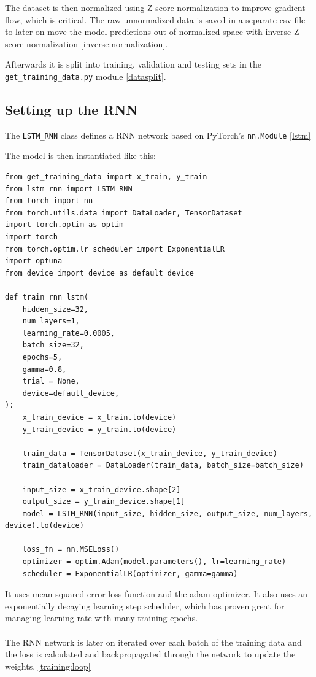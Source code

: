 \documentclass[11pt]{article}
\begin{document}
The dataset is then normalized using Z-score normalization to improve gradient flow, which is critical. The raw unnormalized data is saved in a separate csv file to later on move the model predictions out of normalized space with inverse Z-score normalization \ref{inverse:normalization}.


Afterwards it is split into training, validation and testing sets in the \texttt{get\_training\_data.py} module \ref{datasplit}.

\subsection{Setting up the RNN}

The \texttt{LSTM\_RNN} class defines a RNN network based on PyTorch's \texttt{nn.Module} \ref{lstm}


The model is then instantiated like this:
\begin{lstlisting}
from get_training_data import x_train, y_train
from lstm_rnn import LSTM_RNN
from torch import nn
from torch.utils.data import DataLoader, TensorDataset
import torch.optim as optim
import torch
from torch.optim.lr_scheduler import ExponentialLR
import optuna
from device import device as default_device

def train_rnn_lstm(
    hidden_size=32,
    num_layers=1,
    learning_rate=0.0005,
    batch_size=32,
    epochs=5,
    gamma=0.8,
    trial = None,
    device=default_device,
):
    x_train_device = x_train.to(device)
    y_train_device = y_train.to(device)

    train_data = TensorDataset(x_train_device, y_train_device)
    train_dataloader = DataLoader(train_data, batch_size=batch_size)

    input_size = x_train_device.shape[2]
    output_size = y_train_device.shape[1]
    model = LSTM_RNN(input_size, hidden_size, output_size, num_layers, device).to(device)

    loss_fn = nn.MSELoss()
    optimizer = optim.Adam(model.parameters(), lr=learning_rate)
    scheduler = ExponentialLR(optimizer, gamma=gamma)
\end{lstlisting}

 It uses mean squared error loss function and the adam optimizer. It also uses an exponentially decaying learning step scheduler, which has proven great for managing learning rate with many training epochs. \\ \\  The RNN network is later on iterated over each batch of the training data and the loss is calculated and backpropagated through the network to update the weights. \ref{training:loop}
\end{document}
